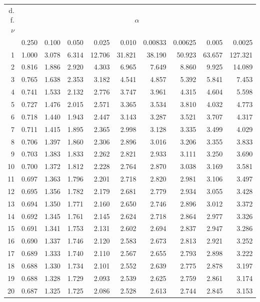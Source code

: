 \begin{mvtable}
{
\begin{tabular}{r|*{9}{r}}
\toprule
\makecell{d. f.\\$\nu$} & \multicolumn{9}{c}{$\alpha$}\\
\cmidrule(lr){2-10}
& 0.250 & 0.100 & 0.050 & 0.025 & 0.010 & 0.00833 & 0.00625 & 0.005 & 0.0025\\
\midrule
1 & 1.000 & 3.078 & 6.314 & 12.706 & 31.821 & 38.190 & 50.923 & 63.657 & 127.321\\
2 & 0.816 & 1.886 & 2.920 & 4.303 & 6.965 & 7.649 & 8.860 & 9.925 & 14.089\\
3 & 0.765 & 1.638 & 2.353 & 3.182 & 4.541 & 4.857 & 5.392 & 5.841 & 7.453\\
4 & 0.741 & 1.533 & 2.132 & 2.776 & 3.747 & 3.961 & 4.315 & 4.604 & 5.598\\
5 & 0.727 & 1.476 & 2.015 & 2.571 & 3.365 & 3.534 & 3.810 & 4.032 & 4.773\\
6 & 0.718 & 1.440 & 1.943 & 2.447 & 3.143 & 3.287 & 3.521 & 3.707 & 4.317\\
7 & 0.711 & 1.415 & 1.895 & 2.365 & 2.998 & 3.128 & 3.335 & 3.499 & 4.029\\
8 & 0.706 & 1.397 & 1.860 & 2.306 & 2.896 & 3.016 & 3.206 & 3.355 & 3.833\\
9 & 0.703 & 1.383 & 1.833 & 2.262 & 2.821 & 2.933 & 3.111 & 3.250 & 3.690\\
10 & 0.700 & 1.372 & 1.812 & 2.228 & 2.764 & 2.870 & 3.038 & 3.169 & 3.581\\
11 & 0.697 & 1.363 & 1.796 & 2.201 & 2.718 & 2.820 & 2.981 & 3.106 & 3.497\\
12 & 0.695 & 1.356 & 1.782 & 2.179 & 2.681 & 2.779 & 2.934 & 3.055 & 3.428\\
13 & 0.694 & 1.350 & 1.771 & 2.160 & 2.650 & 2.746 & 2.896 & 3.012 & 3.372\\
14 & 0.692 & 1.345 & 1.761 & 2.145 & 2.624 & 2.718 & 2.864 & 2.977 & 3.326\\
15 & 0.691 & 1.341 & 1.753 & 2.131 & 2.602 & 2.694 & 2.837 & 2.947 & 3.286\\
16 & 0.690 & 1.337 & 1.746 & 2.120 & 2.583 & 2.673 & 2.813 & 2.921 & 3.252\\
17 & 0.689 & 1.333 & 1.740 & 2.110 & 2.567 & 2.655 & 2.793 & 2.898 & 3.222\\
18 & 0.688 & 1.330 & 1.734 & 2.101 & 2.552 & 2.639 & 2.775 & 2.878 & 3.197\\
19 & 0.688 & 1.328 & 1.729 & 2.093 & 2.539 & 2.625 & 2.759 & 2.861 & 3.174\\
20 & 0.687 & 1.325 & 1.725 & 2.086 & 2.528 & 2.613 & 2.744 & 2.845 & 3.153\\

\end{tabular}}
\end{mvtable}
